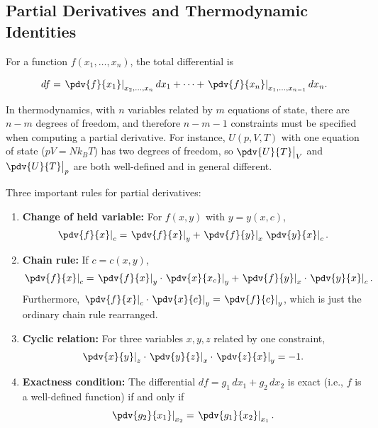 \subsection{Partial Derivatives and Thermodynamic Identities}

For a function $f(x_1,\ldots,x_n)$, the total differential is

\begin{equation}
  df = \left.\pdv{f}{x_1}\right|_{x_2,\ldots,x_n} dx_1 + \cdots + \left.\pdv{f}{x_n}\right|_{x_1,\ldots,x_{n-1}} dx_n.
\end{equation}

In thermodynamics, with $n$ variables related by $m$ equations of state, there are $n-m$ degrees of freedom, and therefore $n-m-1$ constraints must be specified when computing a partial derivative. For instance, $U(p,V,T)$ with one equation of state ($pV=Nk_BT$) has two degrees of freedom, so $\pdv{U}{T}\big|_V$ and $\pdv{U}{T}\big|_p$ are both well-defined and in general different.

Three important rules for partial derivatives:

\begin{enumerate}
  \item \textbf{Change of held variable:} For $f(x,y)$ with $y=y(x,c)$,
        \begin{equation}
          \left.\pdv{f}{x}\right|_c = \left.\pdv{f}{x}\right|_y + \left.\pdv{f}{y}\right|_x \left.\pdv{y}{x}\right|_c.
        \end{equation}

  \item \textbf{Chain rule:} If $c = c(x,y)$,
        \begin{equation}
          \left.\pdv{f}{x}\right|_c = \left.\pdv{f}{x}\right|_y\cdot\left.\pdv{x}{x_c}\right|_y + \left.\pdv{f}{y}\right|_x\cdot\left.\pdv{y}{x}\right|_c.
        \end{equation}
        Furthermore, $\left.\pdv{f}{x}\right|_c\cdot\left.\pdv{x}{c}\right|_y = \left.\pdv{f}{c}\right|_y$, which is just the ordinary chain rule rearranged.

  \item \textbf{Cyclic relation:} For three variables $x,y,z$ related by one constraint,
        \begin{equation}
          \left.\pdv{x}{y}\right|_z\cdot\left.\pdv{y}{z}\right|_x\cdot\left.\pdv{z}{x}\right|_y = -1.
        \end{equation}

  \item \textbf{Exactness condition:} The differential $df = g_1\,dx_1 + g_2\,dx_2$ is exact (i.e., $f$ is a well-defined function) if and only if
        \begin{equation}
          \left.\pdv{g_2}{x_1}\right|_{x_2} = \left.\pdv{g_1}{x_2}\right|_{x_1}.
        \end{equation}
\end{enumerate}

